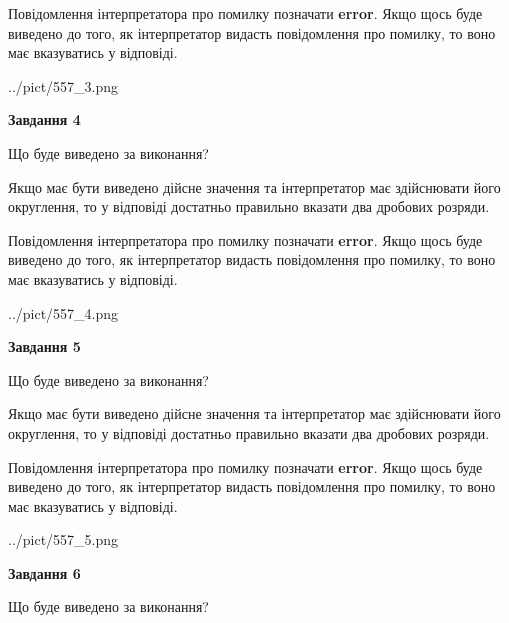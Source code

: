 \documentclass[12pt, ukrainian]{article}
\begin{document}
{\begin {Large}
Повідомлення інтерпретатора про помилку позначати \textbf{error}.
Якщо щось буде виведено до того, як інтерпретатор видасть повідомлення про помилку, 
то воно має вказуватись у відповіді. \par

\begin{center}
	{../pict/557_3.png}
\end{center}
\newpage

{\begin {center}\textbf{Завдання 4}\end {center}}\par
Що буде виведено за виконання? \par

Якщо має бути виведено дійсне значення та інтерпретатор має здійснювати його округлення, 
то у відповіді достатньо правильно вказати два дробових розряди.

Повідомлення інтерпретатора про помилку позначати \textbf{error}.
Якщо щось буде виведено до того, як інтерпретатор видасть повідомлення про помилку, 
то воно має вказуватись у відповіді. \par

\begin{center}
	{../pict/557_4.png}
\end{center}
\newpage

{\begin {center}\textbf{Завдання 5}\end {center}}\par
Що буде виведено за виконання? \par

Якщо має бути виведено дійсне значення та інтерпретатор має здійснювати його округлення, 
то у відповіді достатньо правильно вказати два дробових розряди.

Повідомлення інтерпретатора про помилку позначати \textbf{error}.
Якщо щось буде виведено до того, як інтерпретатор видасть повідомлення про помилку, 
то воно має вказуватись у відповіді. \par

\begin{center}
	{../pict/557_5.png}
\end{center}
\newpage

{\begin {center}\textbf{Завдання 6}\end {center}}\par
Що буде виведено за виконання? \par


\end{Large}}
\end{document}
